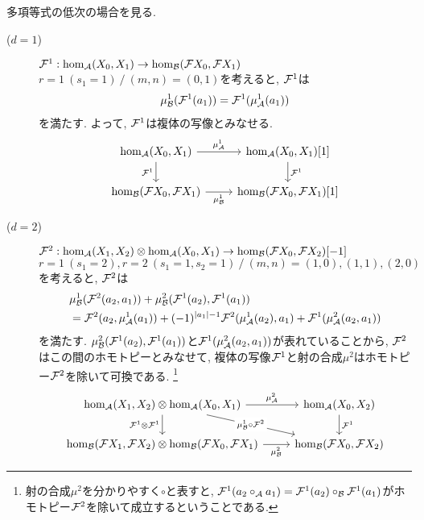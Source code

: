 \documentclass[uplatex, a4paper, 14Q, dvipdfmx]{jsarticle}
\begin{document}
\begin{remark}
  多項等式の低次の場合を見る. 
  \begin{description}
    \item[($d=1$)] $\mathcal{F}^1 : \hom_{\mathcal{A}}(X_0,X_1) \to \hom_{\mathcal{B}}(\mathcal{F} X_0,\mathcal{F} X_1)$ \\
    $r=1 ~ (s_1=1) ~/~ (m,n)=(0,1)$を考えると, $\mathcal{F}^1$は
    \begin{align*}
      \mu^1_{\mathcal{B}}(\mathcal{F}^1(a_1)) = \mathcal{F}^1(\mu^1_{\mathcal{A}}(a_1))
    \end{align*}
    を満たす. 
    よって, $\mathcal{F}^1$は複体の写像とみなせる.
    \[\begin{tikzcd}
      {\hom_\A(X_0,X_1)} & {\hom_\A(X_0,X_1)[1]} \\
      {\hom_\B(\F X_0,\F X_1)} & {\hom_\B(\F X_0,\F X_1)[1]}
      \arrow["{\mu^1_\A}", from=1-1, to=1-2]
      \arrow["{\F^1}", from=1-2, to=2-2]
      \arrow["{\F^1}"', from=1-1, to=2-1]
      \arrow["{\mu^1_\B}"', from=2-1, to=2-2]
    \end{tikzcd}\] 
    \item[($d=2$)] $\mathcal{F}^2 : \hom_{\mathcal{A}}(X_1,X_2) \otimes \hom_{\mathcal{A}}(X_0,X_1) \to \hom_{\mathcal{B}}(\mathcal{F} X_0,\mathcal{F} X_2)[-1]$ \\
    $r=1 ~ (s_1=2), r=2 ~ (s_1=1, s_2=1) ~/~ (m,n)=(1,0), (1,1), (2,0)$を考えると, $\mathcal{F}^2$は
    \begin{align*}
      & \mu^1_{\mathcal{B}}(\mathcal{F}^2(a_2,a_1)) + \mu^2_{\mathcal{B}}(\mathcal{F}^1(a_2), \mathcal{F}^1(a_1)) \\
      & = \mathcal{F}^2(a_2,\mu^1_{\mathcal{A}}(a_1)) + (-1)^{|a_1|-1} \mathcal{F}^2(\mu^1_{\mathcal{A}}(a_2),a_1) + \mathcal{F}^1(\mu^2_{\mathcal{A}}(a_2,a_1))
    \end{align*}
    を満たす. 
    $\mu^2_{\mathcal{B}}(\mathcal{F}^1(a_2), \mathcal{F}^1(a_1))$と$\mathcal{F}^1(\mu^2_{\mathcal{A}}(a_2,a_1))$が表れていることから, $\mathcal{F}^2$はこの間のホモトピーとみなせて, 複体の写像$\mathcal{F}^1$と射の合成$\mu^2$はホモトピー$\mathcal{F}^2$を除いて可換である.
    \footnote{
      射の合成$\mu^2$を分かりやすく$\circ$と表すと, $\mathcal{F}^1(a_2 \circ_{\mathcal{A}} a_1)=\mathcal{F}^1(a_2) \circ_{\mathcal{B}} \mathcal{F}^1(a_1)$がホモトピー$\mathcal{F}^2$を除いて成立するということである. 
    }
    \[\begin{tikzcd}
      {\hom_\A(X_1,X_2) \otimes \hom_\A(X_0,X_1)} & {\hom_\A(X_0,X_2)} \\
      {\hom_\B(\F X_1,\F X_2) \otimes \hom_\B(\F X_0,\F X_1)} & {\hom_\B(\F X_0,\F X_2)}
      \arrow["{\mu^2_\A}", from=1-1, to=1-2]
      \arrow["{\F^1}", from=1-2, to=2-2]
      \arrow["{\F^1 \otimes \F^1}"', from=1-1, to=2-1]
      \arrow["{\mu^2_\B}"', from=2-1, to=2-2]
      \arrow["{\mu^1_\B \circ \F^2}"{description}, from=1-1, to=2-2]
    \end{tikzcd}\] 
  \end{description}
\end{remark}
\end{document}
